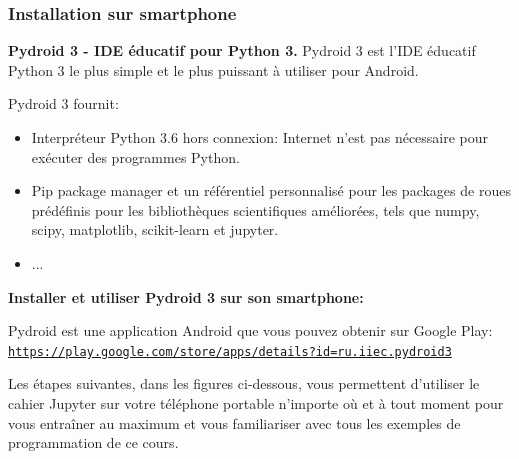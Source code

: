 \documentclass{beamer}
\begin{document}
\begin{frame}
\frametitle{Installation sur smartphone}

\noindent\textbf{Pydroid 3 - IDE éducatif pour Python 3.}
Pydroid 3 est l'IDE éducatif Python 3 le plus simple et le plus puissant à utiliser pour Android.

Pydroid 3 fournit:

\begin{itemize}
\item Interpréteur Python 3.6 hors connexion: Internet n'est pas nécessaire pour exécuter des programmes Python.

\item Pip package manager et un référentiel personnalisé pour les packages de roues prédéfinis pour les bibliothèques scientifiques améliorées, tels que numpy, scipy, matplotlib, scikit-learn et jupyter.

\item ...
\end{itemize}

\noindent
\end{frame}

\begin{frame}

\noindent\textbf{Installer et utiliser Pydroid 3 sur son smartphone:}

Pydroid est une application Android que vous pouvez obtenir sur Google Play: \href{{https://play.google.com/store/apps/details?id=ru.iiec.pydroid3}}{\nolinkurl{https://play.google.com/store/apps/details?id=ru.iiec.pydroid3}}

Les étapes suivantes, dans les figures ci-dessous, vous permettent d’utiliser le cahier Jupyter sur votre téléphone portable n’importe où et à tout moment pour vous entraîner au maximum et vous familiariser avec tous les exemples de programmation de ce cours.
\end{frame}
\end{document}
